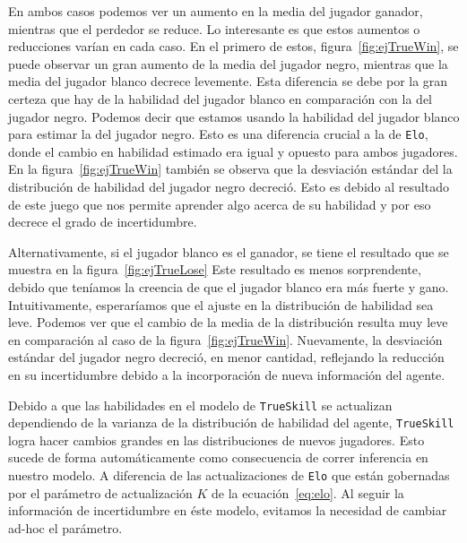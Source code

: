 \documentclass[11pt,twoside,spanish]{report} %
\begin{document}
En ambos casos podemos ver  un aumento en la media del jugador ganador, mientras que el perdedor se reduce.
Lo interesante es que estos aumentos o reducciones var\'ian en cada caso.
En el primero de estos, figura~\ref{fig:ejTrueWin}, se puede observar un gran aumento de la media del jugador negro, mientras que la media del jugador blanco decrece levemente.
Esta diferencia se debe por la gran certeza que hay de la habilidad del jugador blanco en comparaci\'on con la del jugador negro.
Podemos decir que estamos usando la habilidad del jugador blanco para estimar la del jugador negro.
Esto es una diferencia crucial a la de \texttt{Elo}, donde el cambio en habilidad estimado era igual y opuesto para ambos jugadores.
En la figura~\ref{fig:ejTrueWin} tambi\'en se observa que la desviaci\'on est\'andar del la distribuci\'on de habilidad del jugador negro decreci\'o.
Esto es debido al resultado de este juego que nos permite aprender algo acerca de su habilidad y por eso decrece el grado de incertidumbre.

Alternativamente, si el jugador blanco es el ganador, se tiene el resultado que se muestra en la figura~\ref{fig:ejTrueLose}
Este resultado es menos sorprendente, debido que ten\'iamos la creencia de que el jugador blanco era m\'as fuerte y gano.
Intuitivamente, esperar\'iamos que el ajuste en la distribuci\'on de habilidad sea leve.
Podemos ver que el cambio de la media de la distribuci\'on resulta muy leve en comparaci\'on al caso de la figura~\ref{fig:ejTrueWin}.
Nuevamente, la desviaci\'on est\'andar del jugador negro decreci\'o, en menor cantidad, reflejando la reducci\'on en su incertidumbre debido a la incorporaci\'on de nueva informaci\'on del agente.

Debido a que las habilidades en el modelo de \texttt{TrueSkill} se actualizan dependiendo de la varianza de la distribuci\'on de habilidad del agente, \texttt{TrueSkill} logra hacer cambios grandes en las distribuciones de nuevos jugadores.
Esto sucede de forma autom\'aticamente como consecuencia de correr inferencia en nuestro modelo.
A diferencia de las actualizaciones de \texttt{Elo} que est\'an gobernadas por el par\'ametro de actualizaci\'on $K$ de la ecuaci\'on~\ref{eq:elo}.
Al seguir la informaci\'on de incertidumbre en \'este modelo, evitamos la necesidad de cambiar ad-hoc el par\'ametro.
\end{document}
